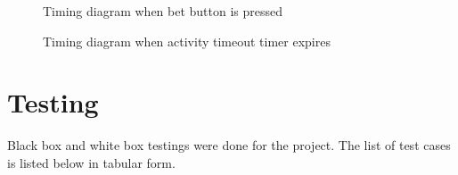 \documentclass[a4paper,13pt,openany,sffamily]{memoir}
\begin{document}
\begin{figure}[h]
\caption{Timing diagram when bet button is pressed }
\label{Fig_Bet_Timing}
\end{figure}

\begin{figure}[h]
\caption{Timing diagram when activity timeout timer expires }
\label{Fig_Timer_Timing}
\end{figure}

\chapter {Testing}
Black box and white box testings were done for the project. The list of test cases is listed below in tabular form.
\end{document}
